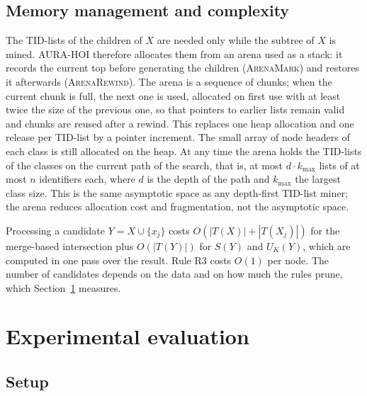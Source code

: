 \documentclass[pdflatex,sn-mathphys,Numbered]{sn-jnl}
\theoremstyle{thmstyleone}
\theoremstyle{thmstyletwo}
\theoremstyle{thmstylethree}
\newcommand{\Ucap}{U}
\newcommand{\AURA}{AURA-HOI}
\begin{document}
\subsection{Memory management and complexity}

The TID-lists of the children of $X$ are needed only while the subtree of $X$ is mined. \AURA{} therefore allocates them from an arena used as a stack: it records the current top before generating the children (\textsc{ArenaMark}) and restores it afterwards (\textsc{ArenaRewind}). The arena is a sequence of chunks; when the current chunk is full, the next one is used, allocated on first use with at least twice the size of the previous one, so that pointers to earlier lists remain valid and chunks are reused after a rewind. This replaces one heap allocation and one release per TID-list by a pointer increment. The small array of node headers of each class is still allocated on the heap. At any time the arena holds the TID-lists of the classes on the current path of the search, that is, at most $d \cdot k_{\max}$ lists of at most $n$ identifiers each, where $d$ is the depth of the path and $k_{\max}$ the largest class size. This is the same asymptotic space as any depth-first TID-list miner; the arena reduces allocation cost and fragmentation, not the asymptotic space.

Processing a candidate $Y = X \cup \{x_j\}$ costs $O(|T(X)| + |T(X_j)|)$ for the merge-based intersection plus $O(|T(Y)|)$ for $S(Y)$ and $\Ucap_K(Y)$, which are computed in one pass over the result. Rule R3 costs $O(1)$ per node. The number of candidates depends on the data and on how much the rules prune, which Section~\ref{sec:exp} measures.

\section{Experimental evaluation}\label{sec:exp}

\subsection{Setup}\label{sec:exp-setup}
\end{document}
